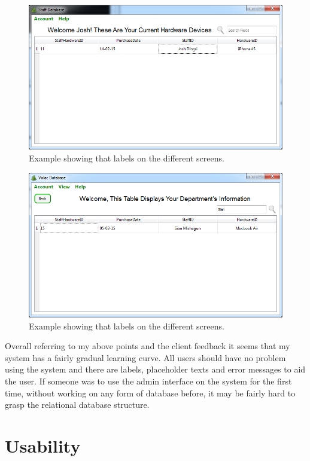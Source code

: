 \begin{figure}[H]
    \includegraphics[width=\textwidth]{./Evaluation/Images/readonlystaff.png}
    \caption{Example showing that labels on the different screens.}
\end{figure}

\begin{figure}[H]
    \includegraphics[width=\textwidth]{./Evaluation/Images/managersearch.png}
    \caption{Example showing that labels on the different screens.} 
\end{figure}

Overall referring to my above points and the client feedback it seems that my system has a fairly gradual learning curve. All users should have no problem using the system and there are labels, placeholder texts and error messages to aid the user. If someone was to use the admin interface on the system for the first time, without working on any form of database before, it may be fairly hard to grasp the relational database structure.

\section{Usability}

